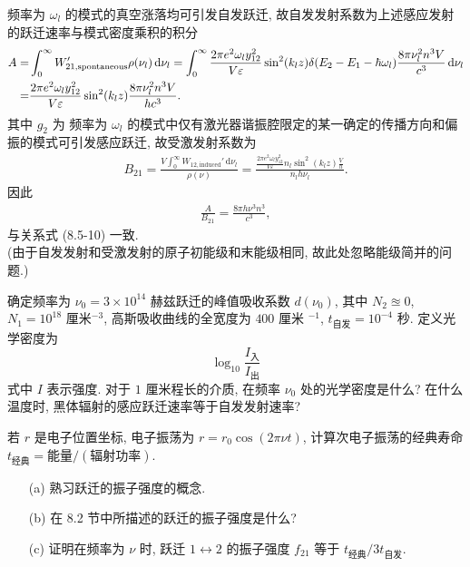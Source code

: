 \documentclass{note}
\begin{document}
\begin{pf}
    频率为 $\omega_l$ 的模式的真空涨落均可引发自发跃迁, 故自发发射系数为上述感应发射的跃迁速率与模式密度乘积的积分
    \begin{align}
        \notag A=&\int_0^{\infty}W_{21,\text{spontaneous}}'\rho(\nu_l)\,\mathrm{d}\nu_l=\int_0^{\infty}\frac{2\pi e^2\omega_ly_{12}^2}{V\varepsilon}\sin^2(k_lz)\delta(E_2-E_1-\hbar\omega_l)\frac{8\pi\nu_l^2n^3V}{c^3}\,\mathrm{d}\nu_l\\
        =&\frac{2\pi e^2\omega_ly_{12}^2}{V\varepsilon}\sin^2(k_lz)\frac{8\pi\nu_l^2n^3V}{hc^3}.
    \end{align}
    其中 $g_2$ 为
    频率为 $\omega_l$ 的模式中仅有激光器谐振腔限定的某一确定的传播方向和偏振的模式可引发感应跃迁, 故受激发射系数为
    \begin{align}
        B_{21}=\frac{V\int_0^{\infty}W_{12,\text{induced}}'\,\mathrm{d}\nu_l}{\rho(\nu)}=\frac{\frac{2\pi e^2\omega_ly_{12}^2}{V\varepsilon}n_l\sin^2(k_lz)\frac{V}{h}}{n_lh\nu_l}.
    \end{align}
    因此
    \begin{align}
        \frac{A}{B_{21}}=\frac{8\pi h\nu^3n^3}{c^3},
    \end{align}
    与关系式 (8.5-10) 一致.\\
    (由于自发发射和受激发射的原子初能级和末能级相同, 故此处忽略能级简并的问题.)
\end{pf}

\begin{exe}
    确定频率为 $\nu_0=3\times 10^{14}$ 赫兹跃迁的峰值吸收系数 $d(\nu_0)$, 其中 $N_2\approxeq 0$, $N_1=10^{18}$ 厘米${}^{-3}$, 高斯吸收曲线的全宽度为 $400$ 厘米 ${}^{-1}$, $t_{\text{自发}}=10^{-4}$ 秒. 定义光学密度为
    \[
        \log_{10}\frac{I_{\text{入}}}{I_{\text{出}}}
    \]
    式中 $I$ 表示强度. 对于 $1$ 厘米程长的介质, 在频率 $\nu_0$ 处的光学密度是什么? 在什么温度时, 黑体辐射的感应跃迁速率等于自发发射速率?
\end{exe}
\begin{sol}
    
\end{sol}

\begin{exe}
    若 $r$ 是电子位置坐标, 电子振荡为 $r=r_0\cos(2\pi\nu t)$, 计算次电子振荡的经典寿命 $t_{\text{经典}}=\text{能量}/(\text{辐射功率})$.
\end{exe}
\begin{sol}
    
\end{sol}

\begin{exe}
    \begin{itemize}
        \item[(a)] 熟习跃迁的振子强度的概念.
        \item[(b)] 在 8.2 节中所描述的跃迁的振子强度是什么?
        \item[(c)] 证明在频率为 $\nu$ 时, 跃迁 $1\leftrightarrow 2$ 的振子强度 $f_{21}$ 等于 $t_{\text{经典}}/3t_{\text{自发}}$.
    \end{itemize}
\end{exe}
\begin{sol}
    
\end{sol}
\end{document}
